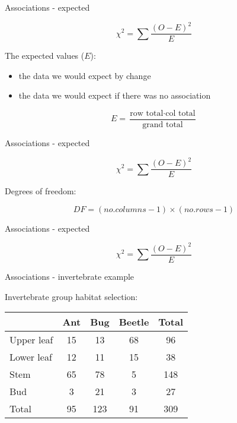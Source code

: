 \documentclass[
  ignorenonframetext,
  t]{beamer}
\providecommand{\tightlist}{%
  \setlength{\itemsep}{0pt}\setlength{\parskip}{0pt}}
\begin{document}
\begin{frame}{Associations - expected}
\protect\hypertarget{associations---expected}{}

\[ \chi^2 = \sum \frac{(O-E)^2}{E}\]

The expected values (\(E\)):

\begin{itemize}
\tightlist
\item
  the data we would expect by change
\item
  the data we would expect if there was no association
\end{itemize}

\[E = \frac{\text{row total} \cdot \text{col total}}{\text{grand total}}\]

\end{frame}

\begin{frame}{Associations - expected}
\protect\hypertarget{associations---expected-1}{}

\[ \chi^2 = \sum \frac{(O-E)^2}{E}\]

Degrees of freedom:

\[ DF = (no. columns -1) \times (no. rows -1)\]

\end{frame}

\begin{frame}{Associations - expected}
\protect\hypertarget{associations---expected-2}{}

\[ \chi^2 = \sum \frac{(O-E)^2}{E}\]


\end{frame}

\begin{frame}{Associations - invertebrate example}
\protect\hypertarget{associations---invertebrate-example}{}

Invertebrate group habitat selection:

\vfill

\centering

\begin{tabular}{lccc|c}
\toprule     
           & Ant & Bug  & Beetle & Total \\ \hline
Upper leaf & 15  &  13  & 68     &  96   \\   
Lower leaf & 12  &  11  & 15     &  38   \\   
Stem       & 65  &  78  &  5     & 148   \\   
Bud        &  3  &  21  &  3     &  27   \\ \hline    
Total      & 95  & 123  & 91     & 309   \\ \bottomrule    

\hline
\end{tabular}

\vfill

\end{frame}
\end{document}
